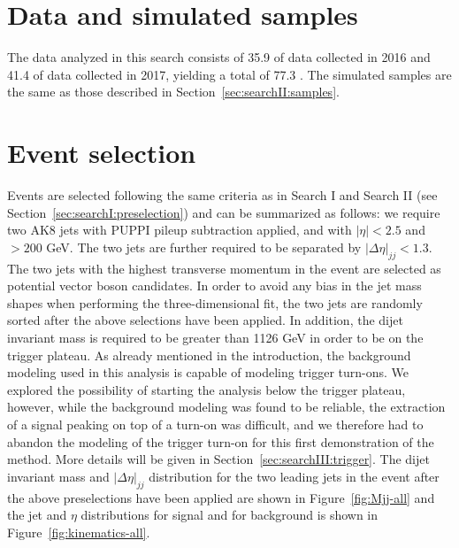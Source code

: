 \section{Data and simulated samples}
The data analyzed in this search consists of 35.9 \fbinv of data collected in 2016 and 41.4 \fbinv of data collected in 2017, yielding a total of 77.3 \fbinv.\newline
The simulated samples are the same as those described in Section~\ref{sec:searchII:samples}.

\section{Event selection}
Events are selected following the same criteria as in Search I and Search II (see Section~\ref{sec:searchI:preselection}) and can be summarized as follows: we require two AK8 jets with PUPPI pileup subtraction applied, and with $|\eta| < 2.5$ and \pt $> 200$ GeV. The two jets are further required to be separated by $|\Delta\eta|_{jj} < 1.3$. The two jets with the highest transverse momentum in the event are selected as potential vector boson candidates. In order to avoid any bias in the jet mass shapes when performing the three-dimensional fit, the two jets are randomly sorted after the above selections have been applied. In addition, the dijet invariant mass is required to be greater than 1126 GeV in order to be on the trigger plateau. As already mentioned in the introduction, the background modeling used in this analysis is capable of modeling trigger turn-ons. We explored the possibility of starting the analysis below the trigger plateau, however, while the background modeling was found to be reliable, the extraction of a signal peaking on top of a turn-on was difficult, and we therefore had to abandon the modeling of the trigger turn-on for this first demonstration of the method. More details will be given in Section~\ref{sec:searchIII:trigger}. The dijet invariant mass and $|\Delta\eta|_{jj}$ distribution for the two leading jets in the event after the above preselections have been applied are shown in Figure~\ref{fig:Mjj-all} and the jet \PT{} and $\eta$ distributions for signal and for background is shown in Figure~\ref{fig:kinematics-all}.
